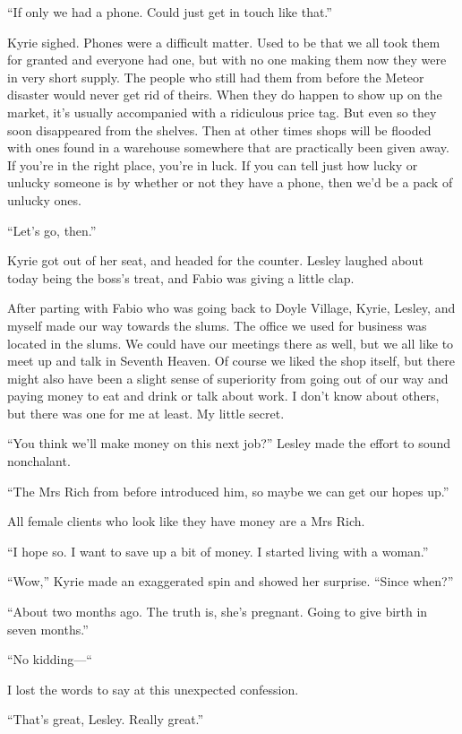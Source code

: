 \documentclass[oneside]{book}
\begin{document}
“If only we had a phone. Could just get in touch like that.”

Kyrie sighed. Phones were a difficult matter. Used to be that we all took them for granted and everyone had one, but with no one making them now they were in very short supply. The people who still had them from before the Meteor disaster would never get rid of theirs. When they do happen to show up on the market, it’s usually accompanied with a ridiculous price tag. But even so they soon disappeared from the shelves. Then at other times shops will be flooded with ones found in a warehouse somewhere that are practically been given away. If you’re in the right place, you’re in luck. If you can tell just how lucky or unlucky someone is by whether or not they have a phone, then we’d be a pack of unlucky ones.

“Let’s go, then.”

Kyrie got out of her seat, and headed for the counter. Lesley laughed about today being the boss’s treat, and Fabio was giving a little clap.

After parting with Fabio who was going back to Doyle Village, Kyrie, Lesley, and myself made our way towards the slums. The office we used for business was located in the slums. We could have our meetings there as well, but we all like to meet up and talk in Seventh Heaven. Of course we liked the shop itself, but there might also have been a slight sense of superiority from going out of our way and paying money to eat and drink or talk about work. I don’t know about others, but there was one for me at least. My little secret.

“You think we’ll make money on this next job?” Lesley made the effort to sound nonchalant.

“The Mrs Rich from before introduced him, so maybe we can get our hopes up.”

All female clients who look like they have money are a Mrs Rich.

“I hope so. I want to save up a bit of money. I started living with a woman.”

“Wow,” Kyrie made an exaggerated spin and showed her surprise. “Since when?”

“About two months ago. The truth is, she’s pregnant. Going to give birth in seven months.”

“No kidding—“

I lost the words to say at this unexpected confession.

“That’s great, Lesley. Really great.”
\end{document}
